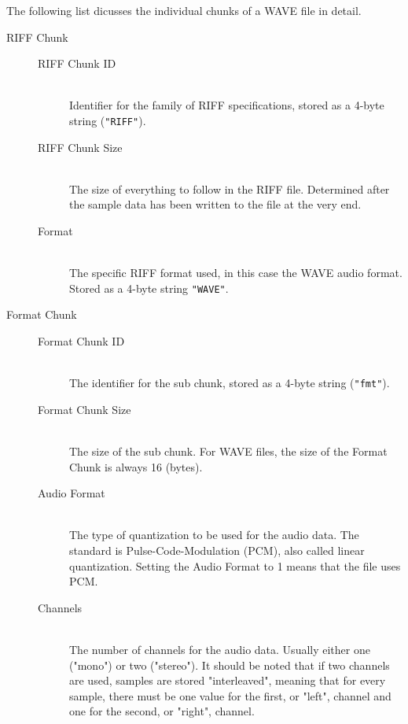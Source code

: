 \documentclass[12pt,twoside]{report}
\begin{document}
The following list dicusses the individual chunks of a WAVE file in detail.

\begin{description}

  \item[RIFF Chunk] \hfill

  \begin{description}

    \item[RIFF Chunk ID] \hfill \\ Identifier for the family of RIFF specifications, stored as a 4-byte string (\texttt{"RIFF"}).

    \item[RIFF Chunk Size] \hfill \\ The size of everything to follow in the RIFF file. Determined after the sample data has been written to the file at the very end.

    \item[Format] \hfill \\ The specific RIFF format used, in this case the WAVE audio format. Stored as a 4-byte string \texttt{"WAVE"}.

  \end{description}

  \item[Format Chunk] \hfill

  \begin{description}

    \item[Format Chunk ID] \hfill \\ The identifier for the sub chunk, stored as a 4-byte string (\texttt{"fmt"}).

    \item[Format Chunk Size] \hfill \\ The size of the sub chunk. For WAVE files, the size of the Format Chunk is always 16 (bytes).

    \item[Audio Format] \hfill \\ The type of quantization to be used for the audio data. The standard is Pulse-Code-Modulation (PCM), also called linear quantization. Setting the Audio Format to 1 means that the file uses PCM.

    \item[Channels] \hfill \\ The number of channels for the audio data. Usually either one ("mono") or two ("stereo"). It should be noted that if two channels are used, samples are stored "interleaved", meaning that for every sample, there must be one value for the first, or "left", channel and one for the second, or "right", channel.


\end{description}
\end{description}
\end{document}
